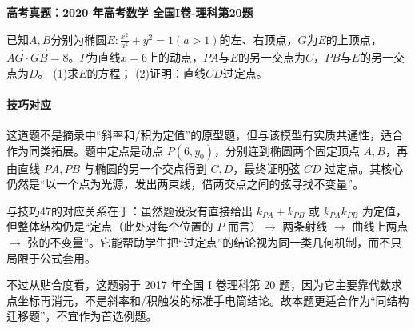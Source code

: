 \documentclass[UTF8,a4paper,11pt]{ctexart}
\newenvironment{gaokao}[1]{\par\medskip\noindent\textbf{高考真题：#1}\par\smallskip}{\par\medskip}
\begin{document}
\begin{gaokao}{2020 年高考数学 全国I卷-理科第20题}

已知$A,B$分别为椭圆$E:\frac{x^2}{a^2}+y^2=1(a>1)$的左、右顶点，$G$为$E$的上顶点，$\overrightarrow{AG}\cdot\overrightarrow{GB}=8$。$P$为直线$x=6$上的动点，$PA$与$E$的另一交点为$C$，$PB$与$E$的另一交点为$D$。
(1)求$E$的方程；
(2)证明：直线$CD$过定点。

\begin{center}


\end{center}

\paragraph{技巧对应}

这道题不是摘录中“斜率和/积为定值”的原型题，但与该模型有实质共通性，适合作为同类拓展。题中定点是动点 $P(6,y_0)$，分别连到椭圆两个固定顶点 $A,B$，再由直线 $PA,PB$ 与椭圆的另一个交点得到 $C,D$，最终证明弦 $CD$ 过定点。其核心仍然是“以一个点为光源，发出两束线，借两交点之间的弦寻找不变量”。

与技巧47的对应关系在于：虽然题设没有直接给出 $k_{PA}+k_{PB}$ 或 $k_{PA}k_{PB}$ 为定值，但整体结构仍是“定点（此处对每个位置的 $P$ 而言）$\to$ 两条射线 $\to$ 曲线上两点 $\to$ 弦的不变量”。它能帮助学生把“过定点”的结论视为同一类几何机制，而不只局限于公式套用。

不过从贴合度看，这题弱于 2017 年全国 I 卷理科第 20 题，因为它主要靠代数求点坐标再消元，不是斜率和/积触发的标准手电筒结论。故本题更适合作为“同结构迁移题”，不宜作为首选例题。


\end{gaokao}
\end{document}
